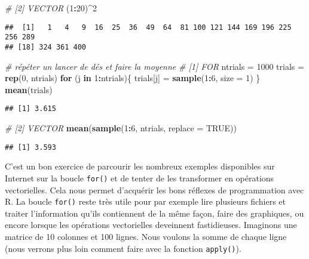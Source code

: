 \documentclass[]{book}
\newenvironment{Shaded}{\begin{snugshade}}{\end{snugshade}}
\newcommand{\KeywordTok}[1]{\textcolor[rgb]{0.13,0.29,0.53}{\textbf{#1}}}
\newcommand{\DataTypeTok}[1]{\textcolor[rgb]{0.13,0.29,0.53}{#1}}
\newcommand{\DecValTok}[1]{\textcolor[rgb]{0.00,0.00,0.81}{#1}}
\newcommand{\StringTok}[1]{\textcolor[rgb]{0.31,0.60,0.02}{#1}}
\newcommand{\CommentTok}[1]{\textcolor[rgb]{0.56,0.35,0.01}{\textit{#1}}}
\newcommand{\OtherTok}[1]{\textcolor[rgb]{0.56,0.35,0.01}{#1}}
\newcommand{\ControlFlowTok}[1]{\textcolor[rgb]{0.13,0.29,0.53}{\textbf{#1}}}
\newcommand{\OperatorTok}[1]{\textcolor[rgb]{0.81,0.36,0.00}{\textbf{#1}}}
\newcommand{\NormalTok}[1]{#1}
\theoremstyle{definition}
\theoremstyle{definition}
\theoremstyle{definition}
\theoremstyle{remark}
\begin{document}
\begin{Shaded}
\begin{Highlighting}[]
\CommentTok{# [2] VECTOR}
\NormalTok{(}\DecValTok{1}\OperatorTok{:}\DecValTok{20}\NormalTok{)}\OperatorTok{^}\DecValTok{2}
\end{Highlighting}
\end{Shaded}

\begin{verbatim}
##  [1]   1   4   9  16  25  36  49  64  81 100 121 144 169 196 225 256 289
## [18] 324 361 400
\end{verbatim}

\begin{Shaded}
\begin{Highlighting}[]
\CommentTok{# répéter un lancer de dés et faire la moyenne}
\CommentTok{# [1] FOR}
\NormalTok{ntrials =}\StringTok{ }\DecValTok{1000}
\NormalTok{trials =}\StringTok{ }\KeywordTok{rep}\NormalTok{(}\DecValTok{0}\NormalTok{, ntrials)}
\ControlFlowTok{for}\NormalTok{ (j }\ControlFlowTok{in} \DecValTok{1}\OperatorTok{:}\NormalTok{ntrials)\{}
\NormalTok{  trials[j] =}\StringTok{ }\KeywordTok{sample}\NormalTok{(}\DecValTok{1}\OperatorTok{:}\DecValTok{6}\NormalTok{, }\DataTypeTok{size =} \DecValTok{1}\NormalTok{)}
\NormalTok{\}}
\KeywordTok{mean}\NormalTok{(trials)}
\end{Highlighting}
\end{Shaded}

\begin{verbatim}
## [1] 3.615
\end{verbatim}

\begin{Shaded}
\begin{Highlighting}[]
\CommentTok{# [2] VECTOR}
\KeywordTok{mean}\NormalTok{(}\KeywordTok{sample}\NormalTok{(}\DecValTok{1}\OperatorTok{:}\DecValTok{6}\NormalTok{, ntrials, }\DataTypeTok{replace =} \OtherTok{TRUE}\NormalTok{))}
\end{Highlighting}
\end{Shaded}

\begin{verbatim}
## [1] 3.593
\end{verbatim}

C'est un bon exercice de parcourir les nombreux exemples disponibles sur
Internet sur la boucle \texttt{for()} et de tenter de les transformer en
opérations vectorielles. Cela nous permet d'acquérir les bons réflexes
de programmation avec R. La boucle \texttt{for()} reste très utile pour
par exemple lire plusieurs fichiers et traiter l'information qu'ils
contiennent de la même façon, faire des graphiques, ou encore lorsque
les opérations vectorielles deveinnent fastidieuses. Imaginons une
matrice de 10 colonnes et 100 lignes. Nous voulons la somme de chaque
ligne (nous verrons plus loin comment faire avec la fonction
\texttt{apply()}).
\end{document}
